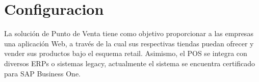 \documentclass[pdftex,12pt,oneside,a4paper,spanish, english, brazil]{abntex2}
\begin{document}
      \begin{sloppypar}
          
            
            \frenchspacing
          
          \pretextual

            
            \cleardoublepage
          



            \vspace{1cm}
           
          \textual
          
          
            \chapter{Configuracion}
            La solución de Punto de Venta tiene como objetivo proporcionar a las empresas una aplicación Web, a través de la cual sus respectivas tiendas puedan ofrecer y vender sus productos bajo el esquema retail.
            Asimismo, el POS se integra con diversos ERPs o sistemas legacy, actualmente el sistema se encuentra certificado para SAP Business One.
            
            

\end{sloppypar}
\end{document}
